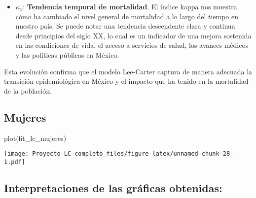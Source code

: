 \documentclass[
]{article}
\newenvironment{Shaded}{\begin{snugshade}}{\end{snugshade}}
\newcommand{\FunctionTok}[1]{\textcolor[rgb]{0.00,0.00,0.00}{#1}}
\newcommand{\NormalTok}[1]{#1}
\providecommand{\tightlist}{%
  \setlength{\itemsep}{0pt}\setlength{\parskip}{0pt}}
\begin{document}
\clearpage

\begin{itemize}
\tightlist
\item
  \(\kappa_x\): \textbf{Tendencia temporal de mortalidad}. El índice
  kappa nos muestra cómo ha cambiado el nivel general de mortalidad a lo
  largo del tiempo en nuestro país. Se puede notar una tendencia
  descendente clara y continua desde principios del siglo XX, lo cual es
  un indicador de una mejora sostenida en las condiciones de vida, el
  acceso a servicios de salud, los avances médicos y las políticas
  públicas en México.
\end{itemize}

Esta evolución confirma que el modelo Lee-Carter captura de manera
adecuada la transición epidemiológica en México y el impacto que ha
tenido en la mortalidad de la población.

\hypertarget{mujeres-2}{%
\subsection{Mujeres}\label{mujeres-2}}

\begin{Shaded}
\begin{Highlighting}[]
\FunctionTok{plot}\NormalTok{(fit\_lc\_mujeres)}
\end{Highlighting}
\end{Shaded}

\texttt{[image: Proyecto-LC-completo\_files/figure-latex/unnamed-chunk-28-1.pdf]}

\hypertarget{interpretaciones-de-las-gruxe1ficas-obtenidas-1}{%
\subsection{Interpretaciones de las gráficas
obtenidas:}\label{interpretaciones-de-las-gruxe1ficas-obtenidas-1}}
\end{document}
